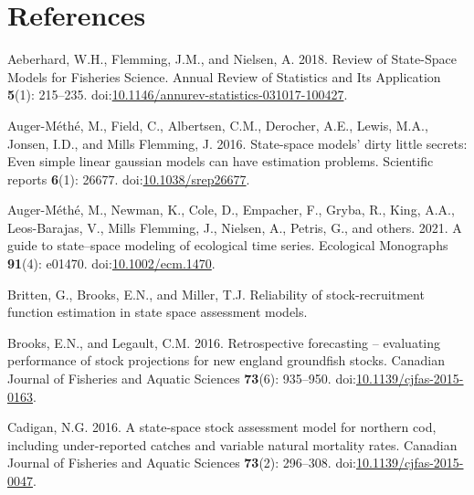 \documentclass[
  12pt,
]{article}
\newlength{\cslhangindent}
\newlength{\cslentryspacingunit} %
\newenvironment{CSLReferences}[2] %
 {%
  \setlength{\parindent}{0pt}
  \ifodd #1
  \let\oldpar\par
  \def\par{\hangindent=\cslhangindent\oldpar}
  \fi
  \setlength{\parskip}{#2\cslentryspacingunit}
 }%
 {}
\begin{document}
\pagebreak

\hypertarget{references}{%
\section*{References}\label{references}}

\hypertarget{refs}{}
\begin{CSLReferences}{1}{0}
\leavevmode{}%
Aeberhard, W.H., Flemming, J.M., and Nielsen, A. 2018. Review of
{State}-{Space Models} for {Fisheries Science}. Annual Review of
Statistics and Its Application \textbf{5}(1): 215--235.
doi:\href{https://doi.org/10.1146/annurev-statistics-031017-100427}{10.1146/annurev-statistics-031017-100427}.

\leavevmode{}%
Auger-Méthé, M., Field, C., Albertsen, C.M., Derocher, A.E., Lewis,
M.A., Jonsen, I.D., and Mills Flemming, J. 2016. State-space models'
dirty little secrets: Even simple linear gaussian models can have
estimation problems. Scientific reports \textbf{6}(1): 26677.
doi:\href{https://doi.org/10.1038/srep26677}{10.1038/srep26677}.

\leavevmode{}%
Auger-Méthé, M., Newman, K., Cole, D., Empacher, F., Gryba, R., King,
A.A., Leos-Barajas, V., Mills Flemming, J., Nielsen, A., Petris, G., and
others. 2021. A guide to state--space modeling of ecological time
series. Ecological Monographs \textbf{91}(4): e01470.
doi:\href{https://doi.org/10.1002/ecm.1470}{10.1002/ecm.1470}.

\leavevmode{}%
Britten, G., Brooks, E.N., and Miller, T.J. Reliability of
stock-recruitment function estimation in state space assessment models.

\leavevmode{}%
Brooks, E.N., and Legault, C.M. 2016. Retrospective forecasting --
evaluating performance of stock projections for new england groundfish
stocks. Canadian Journal of Fisheries and Aquatic Sciences
\textbf{73}(6): 935--950.
doi:\href{https://doi.org/10.1139/cjfas-2015-0163}{10.1139/cjfas-2015-0163}.

\leavevmode{}%
Cadigan, N.G. 2016. A state-space stock assessment model for northern
cod, including under-reported catches and variable natural mortality
rates. Canadian Journal of Fisheries and Aquatic Sciences
\textbf{73}(2): 296--308.
doi:\href{https://doi.org/10.1139/cjfas-2015-0047}{10.1139/cjfas-2015-0047}.


\end{CSLReferences}
\end{document}
